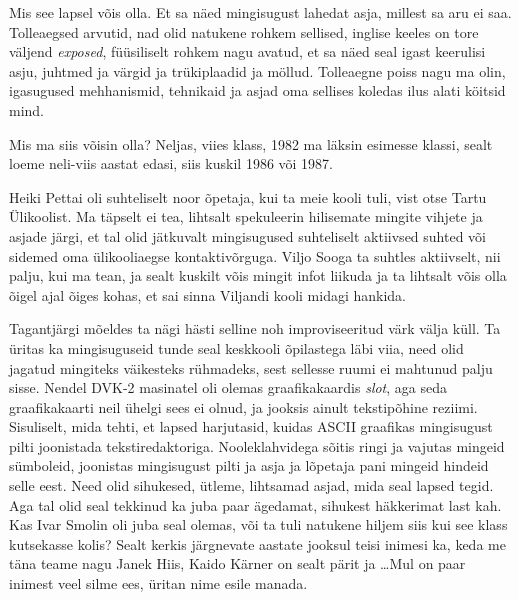 Mis see lapsel võis olla. Et sa näed mingisugust lahedat asja, millest sa aru ei saa. Tolleaegsed arvutid, nad olid natukene rohkem sellised, inglise keeles on tore väljend \emph{exposed}, füüsiliselt rohkem nagu avatud, et sa näed seal igast keerulisi asju, juhtmed ja värgid ja trükiplaadid ja möllud. Tolleaegne poiss nagu ma olin,  igasugused mehhanismid, tehnikaid ja asjad oma sellises koledas ilus alati köitsid mind. 


Mis ma siis võisin olla? Neljas, viies klass, 1982 ma läksin esimesse klassi, sealt loeme neli-viis aastat edasi, siis kuskil 1986 või 1987. 


Heiki Pettai oli suhteliselt noor õpetaja, kui ta meie kooli tuli, vist otse Tartu Ülikoolist. Ma täpselt ei tea, lihtsalt spekuleerin hilisemate mingite vihjete ja asjade järgi, et tal olid jätkuvalt mingisugused suhteliselt aktiivsed suhted või sidemed oma ülikooliaegse kontaktivõrguga. Viljo Sooga ta suhtles aktiivselt, nii palju, kui ma tean, ja sealt kuskilt võis mingit infot liikuda ja ta lihtsalt võis olla õigel ajal õiges kohas, et sai sinna Viljandi kooli  midagi hankida. 


Tagantjärgi mõeldes ta nägi hästi selline noh improviseeritud värk välja küll. Ta üritas ka mingisuguseid tunde seal  keskkooli õpilastega läbi viia, need olid  jagatud mingiteks väikesteks rühmadeks, sest sellesse ruumi ei mahtunud palju  sisse. Nendel DVK-2 masinatel oli olemas graafikakaardis \emph{slot}, aga seda graafikakaarti neil ühelgi sees ei olnud, ja jooksis ainult tekstipõhine reziimi. Sisuliselt, mida tehti, et  lapsed harjutasid, kuidas ASCII graafikas mingisugust pilti joonistada tekstiredaktoriga. Nooleklahvidega sõitis ringi ja vajutas mingeid sümboleid, joonistas mingisugust pilti ja asja ja lõpetaja pani mingeid hindeid selle eest. Need olid sihukesed, ütleme, lihtsamad asjad, mida seal lapsed tegid. Aga tal olid seal tekkinud ka juba paar ägedamat, sihukest häkkerimat last kah. Kas Ivar Smolin oli juba seal olemas, või ta tuli natukene hiljem siis kui see klass kutsekasse kolis? Sealt kerkis  järgnevate aastate jooksul teisi inimesi ka, keda me täna teame nagu Janek Hiis, Kaido Kärner on sealt pärit ja \ldots Mul on paar inimest veel silme ees, üritan nime esile manada.

